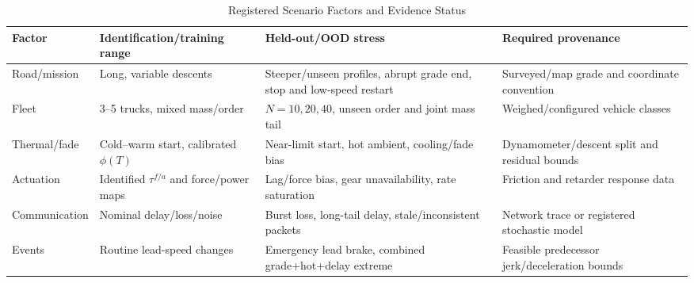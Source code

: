 \begin{table}[t]
\caption{Registered Scenario Factors and Evidence Status}
\label{tab:scenarios}
\centering\footnotesize
\begin{tabular}{p{}p{}p{}p{}}
\toprule
Factor & Identification/training range & Held-out/OOD stress & Required provenance \\
\midrule
Road/mission & Long, variable descents & Steeper/unseen profiles, abrupt grade end, stop and low-speed restart & Surveyed/map grade and coordinate convention \\
Fleet & 3--5 trucks, mixed mass/order & $N=10,20,40$, unseen order and joint mass tail & Weighed/configured vehicle classes \\
Thermal/fade & Cold--warm start, calibrated $\phi(T)$ & Near-limit start, hot ambient, cooling/fade bias & Dynamometer/descent split and residual bounds \\
Actuation & Identified $\tau^{f/a}$ and force/power maps & Lag/force bias, gear unavailability, rate saturation & Friction and retarder response data \\
Communication & Nominal delay/loss/noise & Burst loss, long-tail delay, stale/inconsistent packets & Network trace or registered stochastic model \\
Events & Routine lead-speed changes & Emergency lead brake, combined grade+hot+delay extreme & Feasible predecessor jerk/deceleration bounds \\
\bottomrule
\end{tabular}
\end{table}
